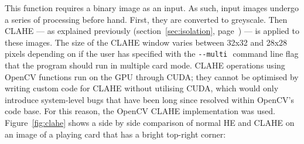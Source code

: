 \documentclass[a4paper,12pt,notitlepage]{article}
\newcommand{\secref}[1]{(section~\ref{#1}, page~\pageref{#1})}
\newcommand{\code}[1]{\colorbox{white}{\lstinline[basicstyle=\ttfamily\color{black}]|#1|} }
\begin{document}
			This function requires a binary image as an input. As such, input images undergo a series of processing before hand. First, they are converted to greyscale. Then CLAHE --- as explained previously \secref{sec:isolation} --- is applied to these images. The size of the CLAHE window varies between 32x32 and 28x28 pixels depending on if the user has specified with the \code{--multi} command line flag that the program should run in multiple card mode. CLAHE operations using OpenCV functions run on the GPU through CUDA; they cannot be optimised by writing custom code for CLAHE without utilising CUDA, which would only introduce system-level bugs that have been long since resolved within OpenCV's code base. For this reason, the OpenCV CLAHE implementation was used. Figure~\ref{fig:clahe} shows a side by side comparison of normal HE and CLAHE on an image of a playing card that has a bright top-right corner:
\end{document}
